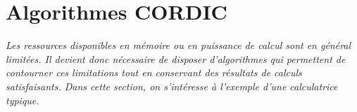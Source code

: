 \documentclass{article}
\begin{document}


 



  




\section{Algorithmes CORDIC}
\label{sec:cordic}

\textit{Les ressources disponibles en m\'emoire ou en puissance de calcul sont en g\'en\'eral limit\'ees. Il devient donc n\'ecessaire de disposer d'algorithmes qui permettent de contourner ces limitations tout en conservant des résultats de calculs satisfaisants. Dans cette section, on s'int\'eresse à l'exemple d'une calculatrice typique.}
\vskip 1mm ~


\end{document}
